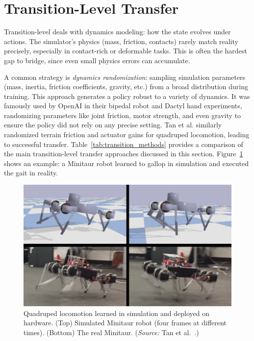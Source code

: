 \section{Transition-Level Transfer}
Transition-level \simtoreal deals with dynamics modeling: how the state evolves under actions. The simulator’s physics (mass, friction, contacts) rarely match reality precisely, especially in contact-rich or deformable tasks. This is often the hardest gap to bridge, since even small physics errors can accumulate.

A common strategy is \emph{dynamics randomization}: sampling simulation parameters (mass, inertia, friction coefficients, gravity, etc.) from a broad distribution during training. This approach generates a policy robust to a variety of dynamics. It was famously used by OpenAI in their bipedal robot and Dactyl hand experiments, randomizing parameters like joint friction, motor strength, and even gravity to ensure the policy did not rely on any precise setting\cite{Akkaya2019}. Tan et al. similarly randomized terrain friction and actuator gains for quadruped locomotion, leading to successful transfer\cite{Tan2018}. Table~\ref{tab:transition_methods} provides a comparison of the main transition-level transfer approaches discussed in this section. Figure~\ref{fig:quadruped} shows an example: a Minitaur robot learned to gallop in simulation and executed the gait in reality.


\begin{figure}[H]
    \centering
    \includegraphics[width=0.95\linewidth]{figures/figMinitaurGallop.png}
    \caption{Quadruped locomotion learned in simulation and deployed on hardware.  (Top) Simulated Minitaur robot (four frames at different times). (Bottom) The real Minitaur. (\emph{Source:} Tan et al.~\cite{Tan2018}.)}
    \label{fig:quadruped}
\end{figure}

